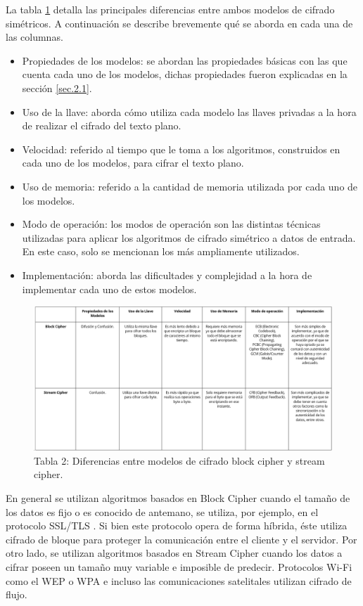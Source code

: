 \documentclass[a4paper,10pt]{article}
\begin{document}
	 La tabla \ref{Diferencias_Block_Stream_Cipher} detalla las principales diferencias entre ambos modelos de cifrado simétricos. A continuación se describe brevemente qué se aborda en cada una de las columnas.
	\begin{itemize}
		\item Propiedades de los modelos: se abordan las propiedades básicas con las que cuenta cada uno de los modelos, dichas propiedades fueron explicadas en la sección \ref{sec.2.1}.
		\item Uso de la llave: aborda cómo utiliza cada modelo las llaves privadas a la hora de realizar el cifrado del texto plano.
		\item Velocidad: referido al tiempo que le toma a los algoritmos, construidos en cada uno de los modelos, para cifrar el texto plano.
		\item Uso de memoria: referido a la cantidad de memoria utilizada por cada uno de los modelos.
		\item Modo de operación: los modos de operación son las distintas técnicas utilizadas para aplicar los algoritmos de cifrado simétrico a datos de entrada. En este caso, solo se mencionan los más ampliamente utilizados.
		\item Implementación: aborda las dificultades y complejidad a la hora de implementar cada uno de estos modelos.
	\end{itemize}
	\begin{figure}[h]
		\centering
		\includegraphics[width=1.0\textwidth]{tablaBlockStreamCipher.PNG}
		\caption{Tabla 2: Diferencias entre modelos de cifrado block cipher y stream cipher.}
		\label{Diferencias_Block_Stream_Cipher}
	\end{figure}
	
	En general se utilizan algoritmos basados en Block Cipher cuando el tamaño de los datos es fijo o es conocido de antemano, se utiliza, por ejemplo, en el protocolo SSL/TLS \parencite{davies2011implementing}. Si bien este protocolo opera de forma híbrida, éste utiliza cifrado de bloque para proteger la comunicación entre el cliente y el servidor. Por otro lado, se utilizan algoritmos basados en Stream Cipher cuando los datos a cifrar poseen un tamaño muy variable e imposible de predecir. Protocolos Wi-Fi como el WEP o WPA e incluso las comunicaciones satelitales utilizan cifrado de flujo.
	
\end{document}

